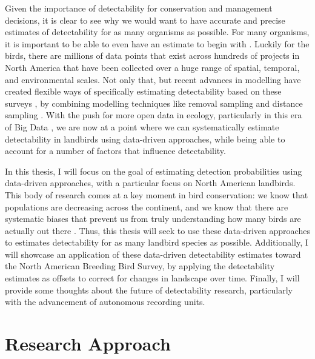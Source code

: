 \par Given the importance of detectability for conservation and management decisions, it is clear to see why we would want to have accurate and precise estimates of detectability for as many organisms as possible.
For many organisms, it is important to be able to even have an estimate to begin with \citep{bennett_how_2024}.
Luckily for the birds, there are millions of data points that exist across hundreds of projects in North America that have been collected over a huge range of spatial, temporal, and environmental scales.
Not only that, but recent advances in modelling have created flexible ways of specifically estimating detectability based on these surveys \citep{solymos_calibrating_2013}, by combining modelling techniques like removal sampling \citep{alldredge_time--detection_2007, farnsworth_removal_2002} and distance sampling \citep{buckland_introduction_2001, buckland_distance_2015}.
With the push for more open data in ecology, particularly in this era of Big Data \citep{binley_minimizing_2023}, we are now at a point where we can systematically estimate detectability in landbirds using data-driven approaches, while being able to account for a number of factors that influence detectability.

\par In this thesis, I will focus on the goal of estimating detection probabilities using data-driven approaches, with a particular focus on North American landbirds.
This body of research comes at a key moment in bird conservation: we know that populations are decreasing across the continent, and we know that there are systematic biases that prevent us from truly understanding how many birds are actually out there \citep{stanton_estimating_2019, solymos_calibrating_2013, solymos_lessons_2020}.
Thus, this thesis will seek to use these data-driven approaches to estimates detectability for as many landbird species as possible.
Additionally, I will showcase an application of these data-driven detectability estimates toward the North American Breeding Bird Survey, by applying the detectability estimates as offsets to correct for changes in landscape over time.
Finally, I will provide some thoughts about the future of detectability research, particularly with the advancement of autonomous recording units.

\section{Research Approach}

